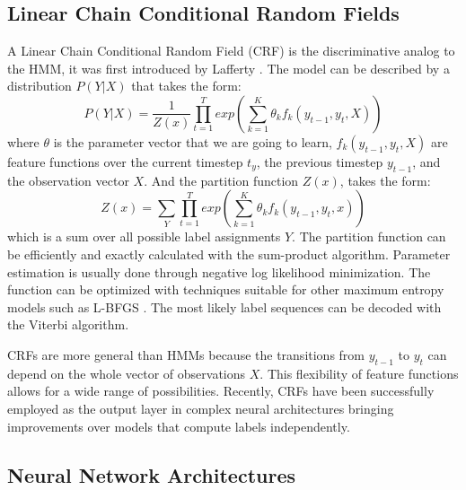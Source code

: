 \documentclass{nle}
\begin{document}
\subsection{Linear Chain Conditional Random Fields}

A Linear Chain Conditional Random Field (CRF) is the discriminative analog to the HMM,
it was first introduced by Lafferty \cite{Lafferty2001}. The model can be described by a 
distribution $ P(Y|X) $ that takes the form:
%
\begin{equation}
P(Y|X) = \frac{1}{Z(x)} \prod_{t=1}^{T} exp \left( \sum_{k=1}^{K} \theta_k f_k(y_{t-1}, y_t, X) \right)
\end{equation}
%
where $ \theta $ is the parameter vector that we are going to learn, $ f_k(y_{t-1}, y_{t}, X) $ 
are feature functions over the current timestep $ t_y $, the previous timestep $ y_{t-1}$, 
and the observation vector $ X $. And the partition function $ Z(x) $, takes the form:
%
\begin{equation}
Z(x) = \sum_{Y} \prod_{t=1}^{T} exp \left( \sum_{k=1}^{K} \theta_k f_k(y_{t-1}, y_t, x) \right)
\end{equation}
%
which is a sum over all possible label assignments $ Y $. The partition function can be efficiently
and exactly calculated with the sum-product algorithm. Parameter estimation is usually done through 
negative log likelihood minimization. The function can be optimized with techniques suitable for other 
maximum entropy models such as L-BFGS \cite{Liu1989}. The most likely label sequences can be decoded 
with the Viterbi algorithm.

CRFs are more general than HMMs because the transitions from $ y_{t-1} $ to $ y_{t} $ can depend 
on the whole vector of observations $ X $. This flexibility of feature functions allows for a wide range of
possibilities. Recently, CRFs have been successfully employed as the output layer in complex neural 
architectures bringing improvements over models that compute labels independently.

\subsection{Neural Network Architectures}
\end{document}
